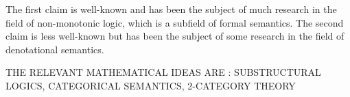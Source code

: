 \documentclass[a4paper,11pt]{report}
\begin{document}
The first claim is well-known and has been the subject of much research in the field of non-monotonic logic, which is a subfield of formal semantics. The second claim is less well-known but has been the subject of some research in the field of denotational semantics.

THE RELEVANT MATHEMATICAL IDEAS ARE : SUBSTRUCTURAL LOGICS, CATEGORICAL SEMANTICS, 2-CATEGORY THEORY
\end{document}
